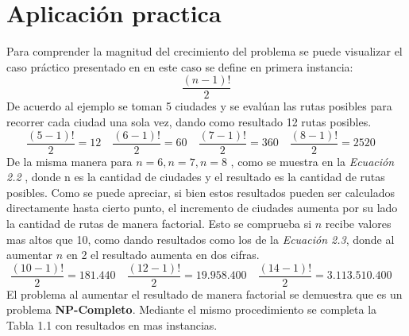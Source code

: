         \section{Aplicación practica}
            Para comprender la magnitud del crecimiento del problema se puede visualizar el caso práctico presentado en \parencite{WikipediaTSP} en este caso se define en primera instancia:
                \begin{equation}
                    \frac{(n-1)!}{2}                                  
                \end{equation}
            De acuerdo al ejemplo se toman 5 ciudades y se evalúan las rutas posibles para recorrer cada ciudad una sola vez, dando como resultado 12 rutas posibles.
                \begin{equation}
                    \frac{(5-1)!}{2} = 12 \quad
                    \frac{(6-1)!}{2} = 60 \quad
                    \frac{(7-1)!}{2} = 360 \quad
                    \frac{(8-1)!}{2} = 2520 \quad                    
                \end{equation}
            De la misma manera para \(n = 6 , n=7, n= 8\) , como se muestra en la \textit{Ecuación 2.2} , donde n es  la cantidad de ciudades y el resultado es la cantidad de rutas posibles. Como se puede apreciar, si bien estos resultados pueden ser calculados directamente hasta cierto punto, el incremento de ciudades aumenta por su lado la cantidad de rutas de manera factorial. Esto se comprueba si \(n\) recibe valores mas altos que 10, como dando resultados como los de la \textit{Ecuación 2.3}, donde al aumentar \(n\) en 2 el resultado aumenta en dos cifras. 
                \begin{equation}
                    \frac{(10-1)!}{2} = 181.440 \quad
                    \frac{(12-1)!}{2} = 19.958.400 \quad
                    \frac{(14-1)!}{2} = 3.113.510.400 \quad                    
                \end{equation}
            El problema al aumentar el resultado de manera factorial se demuestra que es un problema \textbf{NP-Completo}. Mediante el mismo procedimiento se completa la Tabla 1.1 con resultados en mas instancias.
            
